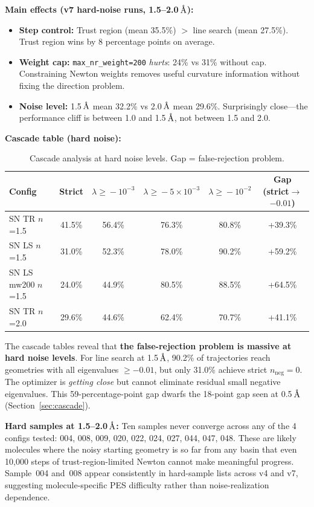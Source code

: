 \documentclass[11pt,a4paper]{article}
\newcommand{\eval}{\lambda}
\newcommand{\angstrom}{\text{\r{A}}}
\begin{document}
\textbf{Main effects (v7 hard-noise runs, 1.5--2.0\,$\angstrom$):}
\begin{itemize}
  \item \textbf{Step control:} Trust region (mean 35.5\%) $>$ line search (mean 27.5\%). Trust region wins by 8 percentage points on average.
  \item \textbf{Weight cap:} \texttt{max\_nr\_weight=200} \emph{hurts}: 24\% vs 31\% without cap. Constraining Newton weights removes useful curvature information without fixing the direction problem.
  \item \textbf{Noise level:} 1.5\,$\angstrom$ mean 32.2\% vs 2.0\,$\angstrom$ mean 29.6\%. Surprisingly close---the performance cliff is between 1.0 and 1.5\,$\angstrom$, not between 1.5 and 2.0.
\end{itemize}

\textbf{Cascade table (hard noise):}

\begin{table}[H]
\centering
\caption{Cascade analysis at hard noise levels. Gap = false-rejection problem.}
\label{tab:v7-hard-cascade}
\small
\begin{tabular}{lccccc}
\toprule
Config & Strict & $\eval\!\geq\!-10^{-3}$ & $\eval\!\geq\!-5\!\times\!10^{-3}$ & $\eval\!\geq\!-10^{-2}$ & Gap (strict$\to$$-0.01$) \\
\midrule
SN TR  $n$=1.5 & 41.5\% & 56.4\% & 76.3\% & 80.8\% & +39.3\% \\
SN LS  $n$=1.5 & 31.0\% & 52.3\% & 78.0\% & 90.2\% & +59.2\% \\
SN LS mw200 $n$=1.5 & 24.0\% & 44.9\% & 80.5\% & 88.5\% & +64.5\% \\
SN TR  $n$=2.0 & 29.6\% & 44.6\% & 62.4\% & 70.7\% & +41.1\% \\
\bottomrule
\end{tabular}
\end{table}

The cascade tables reveal that \textbf{the false-rejection problem is massive at hard noise levels}. For line search at 1.5\,$\angstrom$, 90.2\% of trajectories reach geometries with all eigenvalues $\geq -0.01$, but only 31.0\% achieve strict $n_\text{neg} = 0$. The optimizer is \emph{getting close} but cannot eliminate residual small negative eigenvalues. This 59-percentage-point gap dwarfs the 18-point gap seen at 0.5\,$\angstrom$ (Section~\ref{sec:cascade}).

\textbf{Hard samples at 1.5--2.0\,$\angstrom$:} Ten samples never converge across any of the 4 configs tested: 004, 008, 009, 020, 022, 024, 027, 044, 047, 048. These are likely molecules where the noisy starting geometry is so far from any basin that even 10,000 steps of trust-region-limited Newton cannot make meaningful progress. Sample~004 and~008 appear consistently in hard-sample lists across v4 and v7, suggesting molecule-specific PES difficulty rather than noise-realization dependence.
\end{document}
